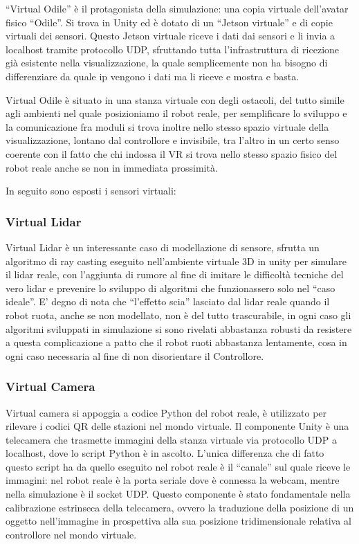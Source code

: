 \documentclass{Configuration_Files/PoliMi3i_thesis}
\begin{document}
“Virtual Odile” è il protagonista della simulazione: una copia virtuale dell’avatar fisico “Odile”. Si trova in Unity ed è dotato di un “Jetson virtuale” e di copie virtuali dei sensori. Questo Jetson virtuale riceve i dati dai sensori e li invia a localhost tramite protocollo UDP, sfruttando tutta l’infrastruttura di ricezione già esistente nella visualizzazione, la quale semplicemente non ha bisogno di differenziare da quale ip vengono i dati ma li riceve e mostra e basta.

Virtual Odile è situato in una stanza virtuale con degli ostacoli, del tutto simile agli ambienti nel quale posizioniamo il robot reale, per semplificare lo sviluppo e la comunicazione fra moduli si trova inoltre nello stesso spazio virtuale della visualizzazione, lontano dal controllore e invisibile, tra l’altro in un certo senso coerente con il fatto che chi indossa il VR si trova nello stesso spazio fisico del robot reale anche se non in immediata prossimità.

In seguito sono esposti i sensori virtuali:

\subsubsection{Virtual Lidar}

Virtual Lidar è un interessante caso di modellazione di sensore, sfrutta un algoritmo di ray casting eseguito nell’ambiente virtuale 3D in unity per simulare il lidar reale, con l’aggiunta di rumore al fine di imitare le difficoltà tecniche del vero lidar e prevenire lo sviluppo di algoritmi che funzionassero solo nel “caso ideale”. E’ degno di nota che “l’effetto scia” lasciato dal lidar reale quando il robot ruota, anche se non modellato, non è del tutto trascurabile, in ogni caso gli algoritmi sviluppati in simulazione si sono rivelati abbastanza robusti da resistere a questa complicazione a patto che il robot ruoti abbastanza lentamente, cosa in ogni caso necessaria al fine di non disorientare il Controllore.

\subsubsection{Virtual Camera}

Virtual camera si appoggia a codice Python del robot reale, è utilizzato per rilevare i codici QR delle stazioni nel mondo virtuale. Il componente Unity è una telecamera che trasmette immagini della stanza virtuale via protocollo UDP a localhost, dove lo script Python è in ascolto. L’unica differenza che di fatto questo script ha da quello eseguito nel robot reale è il “canale” sul quale riceve le immagini: nel robot reale è la porta seriale dove è connessa la webcam, mentre nella simulazione è il socket UDP. Questo componente è stato fondamentale nella calibrazione estrinseca della telecamera, ovvero la traduzione della posizione di un oggetto nell’immagine in prospettiva alla sua posizione tridimensionale relativa al controllore nel mondo virtuale.
\end{document}
